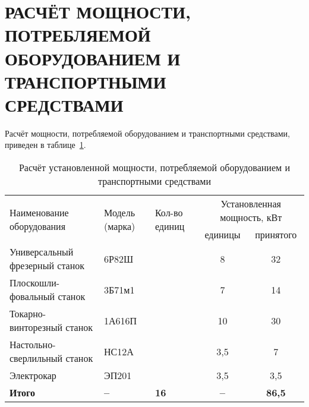 \section[%
Расчёт мощности, потребляемой оборудованием и транспортными \\
средствами]{%
  РАСЧЁТ МОЩНОСТИ, ПОТРЕБЛЯЕМОЙ \\
  ОБОРУДОВАНИЕМ И  ТРАНСПОРТНЫМИ \\ 
  СРЕДСТВАМИ
}
\label{sec:placement}

Расчёт мощности, потребляемой оборудованием и транспортными средствами, 
приведен в таблице~\ref{tbl:tech_power}.

\begin{table} [h!]
  \caption{
    Расчёт установленной мощности, потребляемой
    оборудованием и транспортными средствами 
  }\label{tbl:tech_power}
    \begin{tabular}{| m{4cm} | m{2cm} | m{2cm} | c | c |}
      \hline
      \multirow{2}{*}{\parbox{4cm}{
          \smallskip
          \centering Наименование оборудования
          \smallskip
        }
      }
      & \multirow{2}{*}{\parbox{2cm}{
            \smallskip
            \centering Модель (марка)
            \smallskip
          } 
        }
      & \multirow{2}{*}{\parbox{2cm}{
            \smallskip
            \centering Кол-во единиц
            \smallskip
          }
        }
      & \multicolumn{2}{c|}{Установленная мощность, кВт} \\ \cline{4-5}

      & & 
      & \parbox{3cm}{\centering единицы} 
      & \parbox{3cm}{\centering принятого} \\
      \hline

      Универсальный фрезерный станок & \centering 6Р82Ш 
      &  & 8 & 32 \\
      \hline

      Плоскошли- фовальный станок & \centering 3Б71м1 
      &  & 7 & 14 \\
      \hline

      Токарно-винторезный станок & \centering 1А616П 
      &  & 10 & 30 \\
      \hline

      Настольно-сверлильный станок & \centering НС12А 
      &  & 3{,}5 & 7 \\
      \hline

      Электрокар & \centering ЭП201 
      &  & 3{,}5 & 3{,}5 \\
      \hline

      \raggedleft \textbf{Итого} & \centering \textbf{--} 
      & \centering \textbf{16} & \textbf{--} & \textbf{86{,}5} \\
      \hline
    \end{tabular}
\end{table}

